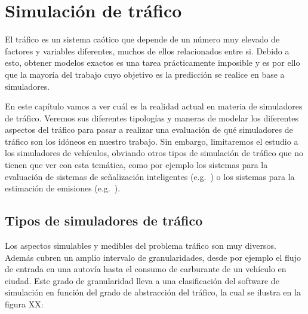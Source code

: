 \chapter{Simulación de tráfico}
\label{ch:sota-traffic-simulation}

El tráfico es un sistema caótico que depende de un número muy elevado de factores y variables diferentes, muchos de ellos relacionados entre si. Debido a esto, obtener modelos exactos es una tarea prácticamente imposible y es por ello que la mayoría del trabajo cuyo objetivo es la predicción se realice en base a simuladores.

En este capítulo vamos a ver cuál es la realidad actual en materia de simuladores de tráfico. Veremos sus diferentes tipologías y maneras de modelar los diferentes aspectos del tráfico para pasar a realizar una evaluación de qué simuladores de tráfico son los idóneos en nuestro trabajo. Sin embargo, limitaremos el estudio a los simuladores de vehículos, obviando otros tipos de simulación de tráfico que no tienen que ver con esta temática, como por ejemplo los sistemas para la evaluación de sistemas de señalización inteligentes (e.g.~\cite{jin2016evaluation}) o los sistemas para la estimación de emisiones (e.g.~\cite{quaassdorff2016microscale}).

\section{Tipos de simuladores de tráfico}

Los aspectos simulables y medibles del problema tráfico son muy diversos. Además cubren un amplio intervalo de granularidades, desde por ejemplo el flujo de entrada en una autovía hasta el consumo de carburante de un vehículo en ciudad. Este grado de granularidad lleva a una clasificación del software de simulación en función del grado de abstracción del tráfico, la cual se ilustra en la figura XX:

